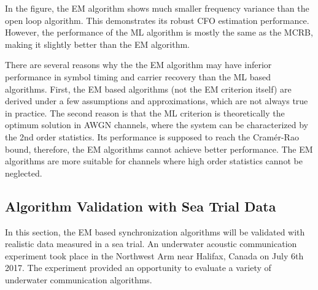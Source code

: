 \documentclass[journal,comsoc,onecolumn, 12pt,draftclsnofoot]{IEEEtran}
\begin{document}
In the figure, the EM algorithm shows much smaller frequency variance than the open loop algorithm. 
This demonstrates its robust CFO estimation performance.
However, the performance of the ML algorithm is mostly the same as the MCRB, making it slightly better than the EM algorithm.

There are several reasons why the the EM algorithm may have inferior performance in symbol timing and carrier recovery than the ML based algorithms.
First, the EM based algorithms (not the EM criterion itself) are derived under a few assumptions and approximations, which are not always true in practice.
The second reason is that the ML criterion is theoretically the optimum solution in AWGN channels, 
where the system can be characterized by the 2nd order statistics.
Its performance is supposed to reach the Cram\'er-Rao bound, therefore, the EM algorithms cannot achieve better performance.
The EM algorithms are more suitable for channels where high order statistics cannot be neglected.
% 
% 

\subsection{Algorithm Validation with Sea Trial Data }
\label{sec:per_sea}
In this section, the EM based synchronization algorithms will be validated with realistic data measured in a sea trial. 
An underwater acoustic communication experiment took place in the Northwest Arm near Halifax, Canada on July 6th 2017. 
The experiment provided an opportunity to evaluate a variety of underwater communication algorithms.
\end{document}
